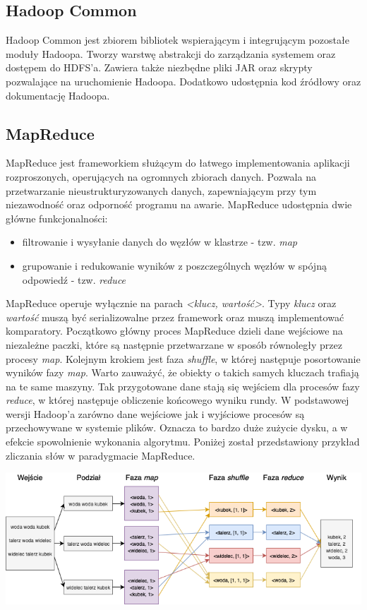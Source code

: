 \documentclass{pracamgr}
\begin{document}
\subsection{Hadoop Common}

Hadoop Common jest zbiorem bibliotek wspierającym i integrującym pozostałe moduły Hadoopa. Tworzy warstwę abstrakcji do zarządzania systemem oraz dostępem do HDFS'a. Zawiera także niezbędne pliki JAR oraz skrypty pozwalające na uruchomienie Hadoopa. Dodatkowo udostępnia kod źródłowy oraz dokumentację Hadoopa.

\subsection{MapReduce}

MapReduce jest frameworkiem służącym do łatwego implementowania aplikacji rozproszonych, operujących na ogromnych zbiorach danych.  Pozwala na przetwarzanie nieustrukturyzowanych danych, zapewniającym przy tym niezawodność oraz odporność programu na awarie. MapReduce udostępnia dwie główne funkcjonalności:
\begin{itemize}
\item filtrowanie i wysyłanie danych do węzłów w klastrze - tzw. \textit{map}
\item grupowanie i redukowanie wyników z poszczególnych węzłów w spójną odpowiedź - tzw. \textit{reduce}
\end{itemize}

MapReduce operuje wyłącznie na parach \textit{<klucz, wartość>}. Typy \textit{klucz} oraz \textit{wartość} muszą być serializowalne przez framework oraz muszą implementować komparatory. Początkowo główny proces MapReduce dzieli dane wejściowe na niezależne paczki, które są następnie przetwarzane w sposób równoległy przez procesy \textit{map}. Kolejnym krokiem jest faza \textit{shuffle}, w której następuje posortowanie wyników fazy \textit{map}. Warto zauważyć, że obiekty o takich samych kluczach trafiają na te same maszyny. Tak przygotowane dane stają się wejściem dla procesów fazy \textit{reduce}, w której następuje obliczenie końcowego wyniku rundy. W podstawowej wersji Hadoop'a zarówno dane wejściowe jak i wyjściowe procesów są przechowywane w systemie plików. Oznacza to bardzo duże zużycie dysku, a w efekcie spowolnienie wykonania algorytmu. Poniżej został przedstawiony przykład zliczania słów w paradygmacie MapReduce.

\includegraphics[width=15cm]{mapreduce_word_count.png}
\end{document}

